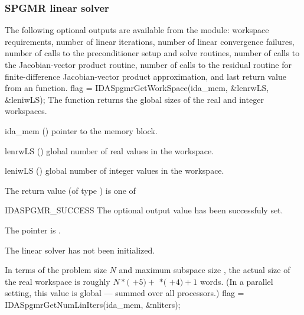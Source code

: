 {\subsubsection{SPGMR linear solver}\label{sss:optout_spgmr}
The following optional outputs are available from the {\idaspgmr} module:
workspace requirements, number of linear iterations,
number of linear convergence failures, number of calls to the preconditioner
setup and solve routines, number of calls to the Jacobian-vector product routine,
 number of calls to the residual routine for finite-difference  Jacobian-vector
 product approximation, and last return value from an {\idaspgmr} function.
{
  flag = IDASpgmrGetWorkSpace(ida\_mem, \&lenrwLS, \&leniwLS);
}
{
  The function  returns the global sizes of
  the {\idaspgmr} real and integer workspaces.
}
{
  \begin{args}[lenrwLS]
  \item[ida\_mem] ()
    pointer to the {\ida} memory block.
  \item[lenrwLS] ()
    global number of real values in the {\idaspgmr} workspace.
  \item[leniwLS] ()
    global number of integer values in the {\idaspgmr} workspace.
  \end{args}
}
{
  The return value  (of type ) is one of
  \begin{args}
  \item[IDASPGMR\_SUCCESS] 
    The optional output value has been successfuly set.
  \item[\Id{IDASPGMR\_MEM\_NULL}]
    The  pointer is .
  \item[\Id{IDASPGMR\_LMEM\_NULL}]
    The {\idaspgmr} linear solver has not been initialized.
  \end{args}
}
{
  In terms of the problem size $N$ and maximum subspace size , 
  the actual size of the real workspace is roughly
  $N*($  $+ 5) +$  $*($  $ + 4) + 1$
   words.  (In a parallel setting, this value is global ---
  summed over all processors.)
}
{
  flag = IDASpgmrGetNumLinIters(ida\_mem, \&nliters);
}}
